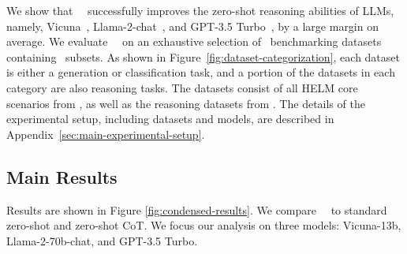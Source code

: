 We show that \zeroshotmid\ \method\ successfully improves the zero-shot reasoning abilities of LLMs, namely, Vicuna~\citep{vicuna2023}, Llama-2-chat~\citep{touvron2023llama2}, and GPT-3.5 Turbo~\citep{openaichatgpt}, by a large margin on average. We evaluate \zeroshotmid\ \method\ on an exhaustive selection of \NumDatasets\ benchmarking datasets containing \NumSubsets\ subsets. As shown in Figure~\ref{fig:dataset-categorization}, each dataset is either a generation or classification task, and a portion of the datasets in each category are also reasoning tasks. The datasets consist of all HELM core scenarios from \citet{liang2022holistic}, as well as the reasoning datasets from \citet{kojima2023large}. The details of the experimental setup, including datasets and models, are described in Appendix~\ref{sec:main-experimental-setup}.

\subsection{Main Results}
Results are shown in Figure \ref{fig:condensed-results}. We compare \zeroshotmid\ \method\ to standard zero-shot and zero-shot CoT. We focus our analysis on three models: Vicuna-13b, Llama-2-70b-chat, and GPT-3.5 Turbo. 

